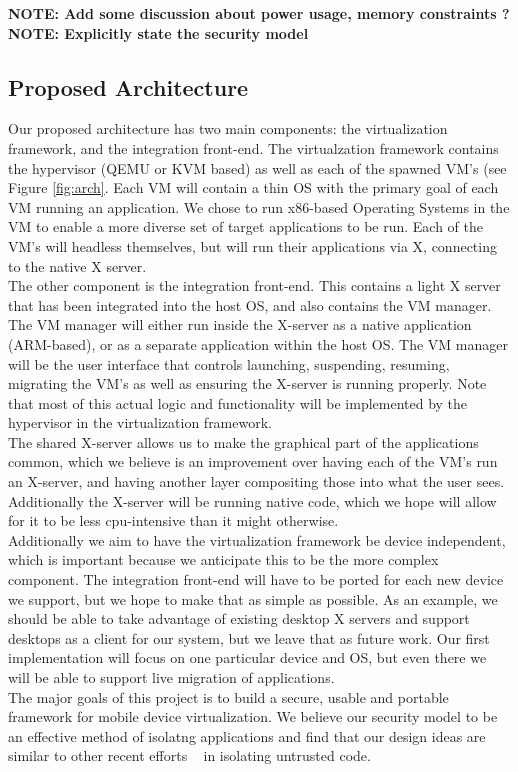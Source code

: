 {\bf NOTE: Add some discussion about power usage, memory constraints ? \newline}
{\bf NOTE: Explicitly state the security model \newline}

\subsection{Proposed Architecture}
\label{sec:proposedarch}
Our proposed architecture has two main components: the virtualization framework, and the integration front-end.  The virtualzation framework contains the hypervisor (QEMU or KVM based) as well as each of the spawned VM's (see Figure \ref{fig:arch}.  Each VM will contain a thin OS with the primary goal of each VM running an application.  We chose to run x86-based Operating Systems in the VM to enable a more diverse set of target applications to be run. Each of the VM's will headless themselves, but will run their applications via X, connecting to the native X server. \\

The other component is the integration front-end.  This contains a light X server that has been integrated into the host OS, and also contains the VM manager.  The VM manager will either run inside the X-server as a native application (ARM-based), or as a separate application within the host OS.  The VM manager will be the user interface that controls launching, suspending, resuming, migrating the VM's as well as ensuring the X-server is running properly. Note that most of this actual logic and functionality will be implemented by the hypervisor in the virtualization framework.\\

The shared X-server allows us to make the graphical part of the applications common, which we believe is an improvement over having each of the VM's run an X-server, and having another layer compositing those into what the user sees. Additionally the X-server will be running native code, which we hope will allow for it to be less cpu-intensive than it might otherwise. \\

Additionally we aim to have the virtualization framework be device independent, which is important because we anticipate this to be the more complex component.  The integration front-end will have to be ported for each new device we support, but we hope to make that as simple as possible.  As an example, we should be able to take advantage of existing desktop X servers and support desktops as a client for our system, but we leave that as future work.  Our first implementation will focus on one particular device and OS, but even there we will be able to support live migration of applications. \\

The major goals of this project is to build a secure, usable and portable framework for mobile device virtualization. We believe our security model to be an effective method of isolatng applications and find that our design ideas are similar to other recent efforts ~\cite{grier2008secure} in isolating untrusted code.

